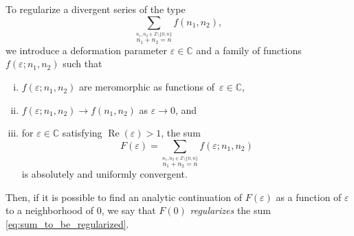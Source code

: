 \documentclass[]{article}
\renewcommand{\Re}{\operatorname{Re}}
\newcommand{\kf}[1]{{\color{magenta}{#1}}}
\begin{document}
To regularize a divergent series of the type
\begin{equation}\label{eq:sum_to_be_regularized}
        \sum_{ \stackrel{n_1, n_2 \in \mathbb{Z} \setminus \{0, n\}  }{n_1+n_2=n}} f(n_1, n_2),
\end{equation}
we  introduce a deformation parameter $\varepsilon \in \mathbb{C}$ and a family of functions $f(\varepsilon; n_1, n_2)$ such that 
\begin{enumerate}[(i)]
 \item $f(\varepsilon; n_1, n_2)$ are meromorphic as functions of~$\varepsilon \in \mathbb{C}$, %
\item 
$
  f(\varepsilon; n_1, n_2) \to  f(n_1, n_2)
$
as $\varepsilon \to 0$,
and 
\item for $\varepsilon \in \mathbb{C}$ satisfying $\Re(\varepsilon) > 1$,  the sum 
\begin{equation}\label{eq:sum_F_sssllkfkkkwppoooe}
F(\varepsilon) =        \sum_{ \stackrel{n_1, n_2 \in \mathbb{Z} \setminus \{0, n\}  }{n_1+n_2=n}}  f(\varepsilon; n_1, n_2)
\end{equation}
is absolutely and uniformly convergent.
\end{enumerate}
Then, if it is possible to find an analytic continuation of $F(\varepsilon)$ as a function of $\varepsilon$ to a neighborhood of 0, we say that $F(0)$ \textit{regularizes} the sum \eqref{eq:sum_to_be_regularized}. 
\end{document}
